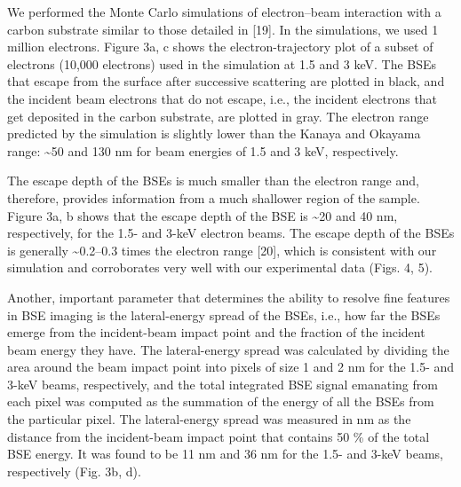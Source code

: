 \documentclass{article}
\begin{document}
We performed the Monte Carlo simulations of electron–beam interaction with a carbon substrate similar to those detailed in [19]. In the simulations, we used 1 million electrons. Figure 3a, c shows the electron-trajectory plot of a subset of electrons (10,000 electrons) used in the simulation at 1.5 and 3 keV. The BSEs that escape from the surface after successive scattering are plotted in black, and the incident beam electrons that do not escape, i.e., the incident electrons that get deposited in the carbon substrate, are plotted in gray. The electron range predicted by the simulation is slightly lower than the Kanaya and Okayama range: \textasciitilde{}50 and 130 nm for beam energies of 1.5 and 3 keV, respectively.

The escape depth of the BSEs is much smaller than the electron range and, therefore, provides information from a much shallower region of the sample. Figure 3a, b shows that the escape depth of the BSE is \textasciitilde{}20 and 40 nm, respectively, for the 1.5- and 3-keV electron beams. The escape depth of the BSEs is generally \textasciitilde{}0.2–0.3 times the electron range [20], which is consistent with our simulation and corroborates very well with our experimental data (Figs. 4, 5).

Another, important parameter that determines the ability to resolve fine features in BSE imaging is the lateral-energy spread of the BSEs, i.e., how far the BSEs emerge from the incident-beam impact point and the fraction of the incident beam energy they have. The lateral-energy spread was calculated by dividing the area around the beam impact point into pixels of size 1 and 2 nm for the 1.5- and 3-keV beams, respectively, and the total integrated BSE signal emanating from each pixel was computed as the summation of the energy of all the BSEs from the particular pixel. The lateral-energy spread was measured in nm as the distance from the incident-beam impact point that contains 50 \% of the total BSE energy. It was found to be 11 nm and 36 nm for the 1.5- and 3-keV beams, respectively (Fig. 3b, d).
\end{document}
